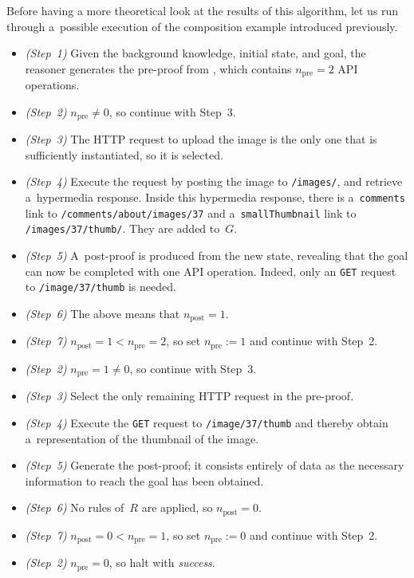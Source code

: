 Before having a more theoretical look at the results of this algorithm,
let us run through a~possible execution
of the composition example introduced previously.

\newcommand\stepref[1]{\emph{(Step~#1)}}
\begin{itemize}
  \item \stepref{1} Given the background knowledge, initial state, and goal,
        the reasoner generates the pre-proof from ,
        which contains $n_{\text{pre}} = 2$ API operations.
  \item \stepref{2} $n_{\text{pre}} \neq 0$, so continue with Step~3.
  \item \stepref{3} The HTTP request to upload the image
        is the only one that is sufficiently instantiated,
        so it is selected.
  \item \stepref{4} Execute the \http request
        by posting the image to \verb!/images/!,
        and retrieve a~hypermedia response.
        Inside this hypermedia response,
        there is a~\verb!comments! link to \verb!/comments/about/images/37!
        and a~\verb!smallThumbnail! link to \verb!/images/37/thumb/!.
        They are added to~$G$.
  \item \stepref{5} A~post-proof is produced from the new state,
        revealing that the goal can now be completed with one API operation.
        Indeed, only an \http \verb!GET! request to \verb!/image/37/thumb! is needed.
  \item \stepref{6} The above means that $n_{\text{post}} = 1$.
  \item \stepref{7} $n_{\text{post}} = 1 < n_{\text{pre}} = 2$,
        so set $n_{\text{pre}} := 1$ and continue with Step~2.
  \item \stepref{2} $n_{\text{pre}} = 1 \neq 0$, so continue with Step~3.
  \item \stepref{3} Select the only remaining HTTP request in the pre-proof.
  \item \stepref{4} Execute the \verb!GET! request to \verb!/image/37/thumb!
        and thereby obtain a~representation of the thumbnail of the image.
  \item \stepref{5} Generate the post-proof;
        it consists entirely of data
        as the necessary information to reach the goal has been obtained.
  \item \stepref{6} No rules of~$R$ are applied, so $n_{\text{post}} = 0$.
  \item \stepref{7} $n_{\text{post}} = 0 < n_{\text{pre}} = 1$,
        so set $n_{\text{pre}} := 0$ and continue with Step~2.
  \item \stepref{2} $n_{\text{pre}} = 0$, so halt with \textit{success}.
\end{itemize}

